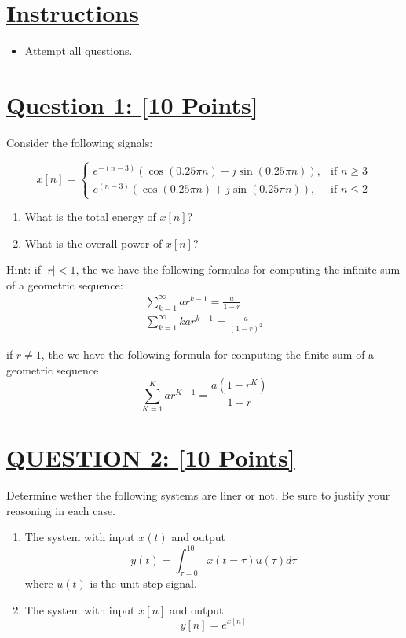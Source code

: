 \documentclass{article}
\begin{document}
\section*{\underline{Instructions}}
\begin{itemize}
	\item Attempt all questions.
\end{itemize}
\section*{\underline{Question 1: [10 Points]}}    
Consider the following signals:

\begin{equation}
x[n] = \begin{cases}
	e^{-(n-3)}(\cos(0.25\pi n) + j\sin(0.25\pi n)), & \text{if } n \geq 3 \\
	e^{(n-3)}(\cos(0.25\pi n) + j\sin(0.25\pi n)), & \text{if } n \leq 2
\end{cases}
\end{equation}

\begin{enumerate}
	\item What is the total energy of $x[n]$?
	\item What is the overall power of $x[n]$?
\end{enumerate}

Hint: if $|r|<1$, the we have the following formulas for computing the infinite sum of a geometric sequence:
\begin{align*}
\sum^\infty_{k=1} ar^{k-1}=\frac{a}{1-r} \\
\sum^\infty_{k=1} kar^{k-1}=\frac{a}{(1-r)^2}
\end{align*}

if $r \neq 1$, the we have the following formula for computing the finite sum of a geometric sequence
$$
\sum^K_{K=1} ar^{K-1}=\frac{a(1 - r^K)}{1-r}
$$
\section*{\underline{QUESTION 2: [10 Points]}}

Determine wether the following systems are liner or not. Be sure to justify your reasoning in each case.

\begin{enumerate}
\item The system with input $x(t)$ and output $$y(t)=\int^{10}_{\tau=0}x(t=\tau)u(\tau)d\tau$$ where $u(t)$ is the unit step signal.
\item The system with input $x[n]$ and output $$y[n] = e^{x[n]}$$
\end{enumerate}
\end{document}
